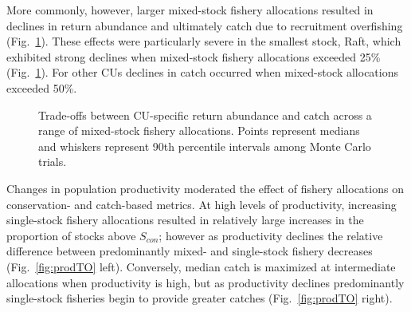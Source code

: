 \documentclass[11pt]{book}
\begin{document}
More commonly, however, larger mixed-stock fishery allocations resulted in declines in return abundance and ultimately catch due to recruitment overfishing (Fig.~\ref{fig:cuTO}). These effects were particularly severe in the smallest stock, Raft, which exhibited strong declines when mixed-stock fishery allocations exceeded 25\% (Fig.~\ref{fig:cuTO}). For other CUs declines in catch occurred when mixed-stock allocations exceeded 50\%.
\begin{figure}[htb]

{\centering {} 

}

\caption{Trade-offs between CU-specific return abundance and catch across a range of mixed-stock fishery allocations. Points represent medians and whiskers represent 90th percentile intervals among Monte Carlo trials.}\label{fig:cuTO}
\end{figure}
Changes in population productivity moderated the effect of fishery allocations on conservation- and catch-based metrics. At high levels of productivity, increasing single-stock fishery allocations resulted in relatively large increases in the proportion of stocks above \(S_{con}\); however as productivity declines the relative difference between predominantly mixed- and single-stock fishery decreases (Fig.~\ref{fig:prodTO} left). Conversely, median catch is maximized at intermediate allocations when productivity is high, but as productivity declines predominantly single-stock fisheries begin to provide greater catches (Fig.~\ref{fig:prodTO} right).
\end{document}
